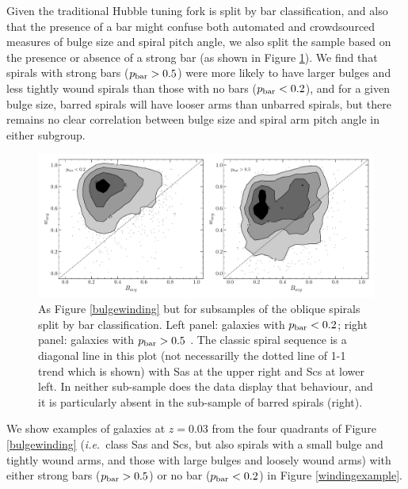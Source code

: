 \documentclass[usenatbib]{mn2e}
\newcommand{\ie}{{\it i.e.}}
\begin{document}
 Given the traditional Hubble tuning fork is split by bar classification, and also that the presence of a bar might confuse both automated and crowdsourced measures of bulge size and spiral pitch angle, we also split the sample based on the presence or absence of a strong bar (as shown in Figure \ref{bars}). We find that spirals with strong bars ($p_{\rm bar}>0.5$)  were more likely to have larger bulges and less tightly wound spirals than those with no bars ($p_{\rm bar} < 0.2$), and for a given bulge size, barred spirals will have looser arms than unbarred spirals, but there remains no clear correlation between bulge size and spiral arm pitch angle in either subgroup.  
  
 \begin{figure}
\includegraphics[width=160mm]{bulge_armwinding_split_bar.pdf}
\caption{As Figure \ref{bulgewinding} but for subsamples of the oblique spirals split by bar classification.  Left panel: galaxies with $p_{\rm bar} < 0.2$; right panel: galaxies with $p_{\rm bar} > 0.5$ \label{bars}. The classic spiral sequence is a diagonal line in this plot (not necessarilly the dotted line of 1-1 trend which is shown) with Sas at the upper right and Scs at lower left. In neither sub-sample does the data display that behaviour, and it is particularly absent in the sub-sample of barred spirals (right).}
\end{figure}

 We show examples of galaxies at $z=0.03$ from the four quadrants of Figure \ref{bulgewinding} (\ie ~class Sas and Scs, but also spirals with a small bulge and tightly wound arms, and those with large bulges and loosely wound arms) with either strong bars ($p_{\rm bar}>0.5$) or no bar ($p_{\rm bar} < 0.2$) in Figure \ref{windingexample}. 
 
\end{document}
